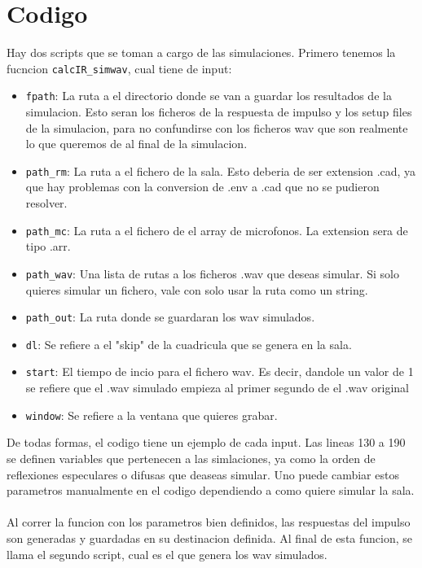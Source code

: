 \documentclass{article}
\begin{document}
\section{Codigo}
Hay dos scripts que se toman a cargo de las simulaciones. Primero tenemos la fucncion \texttt{calcIR\_simwav}, cual tiene de input: 
\begin{itemize}
    \item \texttt{fpath}: La ruta a el directorio donde se van a guardar los resultados de la simulacion. Esto seran los ficheros de la respuesta de impulso y los setup files de la simulacion, para no confundirse con los ficheros wav que son realmente lo que queremos de al final de la simulacion. 
    \item \texttt{path\_rm}: La ruta a el fichero de la sala. Esto deberia de ser extension .cad, ya que hay problemas con la conversion de .env a .cad que no se pudieron resolver.
    \item \texttt{path\_mc}: La ruta a el fichero de el array de microfonos. La extension sera de tipo .arr.
    \item \texttt{path\_wav}: Una lista de rutas a los ficheros .wav que deseas simular. Si solo quieres simular un fichero, vale con solo usar la ruta como un string.
    \item \texttt{path\_out}: La ruta donde se guardaran los wav simulados.
    \item \texttt{dl}: Se refiere a el "skip" de la cuadricula que se genera en la sala. 
    \item \texttt{start}: El tiempo de incio para el fichero wav. Es decir, dandole un valor de 1 se refiere que el .wav simulado empieza al primer segundo de el .wav original
    \item \texttt{window}: Se refiere a la ventana que quieres grabar. 
\end{itemize}
De todas formas, el codigo tiene un ejemplo de cada input.
Las lineas 130 a 190 se definen variables que pertenecen a las simlaciones, ya como la orden de reflexiones especulares o difusas que deaseas simular. Uno puede cambiar estos parametros manualmente en el codigo dependiendo a como quiere simular la sala.\\\\
Al correr la funcion con los parametros bien definidos, las respuestas del impulso son generadas y guardadas en su destinacion definida. Al final de esta funcion, se llama el segundo script, cual es el que genera los wav simulados. \\\\
\end{document}
